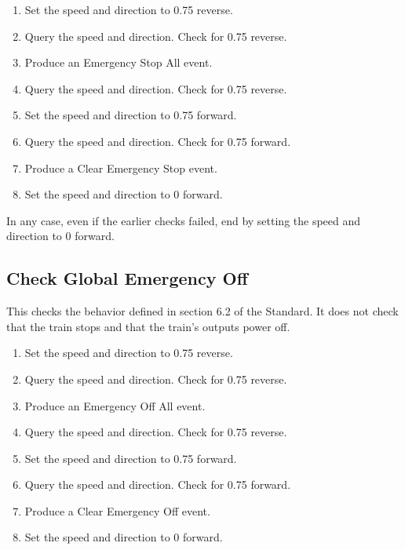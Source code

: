 \begin{enumerate}

    \item Set the speed and direction to 0.75 reverse.

    \item Query the speed and direction. Check for 0.75 reverse.

    \item Produce an Emergency Stop All event.

    \item Query the speed and direction. Check for 0.75 reverse.

    \item Set the speed and direction to 0.75 forward.

    \item Query the speed and direction. Check for 0.75 forward.

    \item Produce a Clear Emergency Stop event.
    
    \item Set the speed and direction to 0 forward.

\end{enumerate}

In any case, even if the earlier checks failed, end by setting the speed 
and direction to 0 forward.

\subsection{Check Global Emergency Off}

This checks the behavior defined in section 6.2 of the Standard.
It does not check that the train stops and that the train's outputs power off.

\begin{enumerate}

    \item Set the speed and direction to 0.75 reverse.

    \item Query the speed and direction. Check for 0.75 reverse.

    \item Produce an Emergency Off All event.

    \item Query the speed and direction. Check for 0.75 reverse.

    \item Set the speed and direction to 0.75 forward.

    \item Query the speed and direction. Check for 0.75 forward.

    \item Produce a Clear Emergency Off event.
    
    \item Set the speed and direction to 0 forward.

\end{enumerate}

